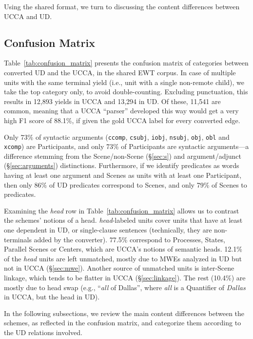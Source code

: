 \documentclass[11pt,a4paper]{article}
\begin{document}
Using the shared format,
we turn to discussing the content differences between UCCA and UD.


\subsection{Confusion Matrix}\label{sec:confusion}

Table~\ref{tab:confusion_matrix} presents the confusion matrix of categories between converted UD
and the UCCA, in the shared EWT corpus.
In case of multiple units with the same terminal yield (i.e., unit with a single non-remote child),
we take the top category only, to avoid double-counting.
Excluding punctuation, this results in 12,893 yields in UCCA and
13,294 in UD.
Of these, 11,541 are common, meaning that a UCCA ``parser'' developed this way
would get a very high F1 score
of 88.1\%, if given the gold UCCA label for every converted edge.

Only 73\% of syntactic arguments
(\texttt{ccomp}, \texttt{csubj}, \texttt{iobj}, \texttt{nsubj}, \texttt{obj}, \texttt{obl} and \texttt{xcomp})
are Participants,
and only 73\% of Participants are syntactic arguments---a difference stemming from
the Scene/non-Scene (\S\ref{sec:s}) and argument/adjunct (\S\ref{sec:arguments}) distinctions.
Furthermore, if we identify predicates as words having at least one argument
and Scenes as units with at least one Participant,
then only 86\% of UD predicates correspond to Scenes,
and only 79\% of Scenes to predicates.

Examining the {\it head} row in Table~\ref{tab:confusion_matrix} allows
us to contrast the schemes' notions of a head. 
{\it head}-labeled units cover units that have at least
one dependent in UD, or single-clause sentences (technically, they are non-terminals added by the converter).
77.5\% correspond to Processes, States, Parallel Scenes or Centers,
which are UCCA's notions of semantic heads.
12.1\% of the {\it head} units are left unmatched, mostly due to MWEs analyzed in
UD but not in UCCA (\S\ref{sec:mwe}).
Another source of unmatched units is inter-Scene linkage, which tends to be flatter in
UCCA (\S\ref{sec:linkage}).
The rest (10.4\%) are mostly due to head swap (e.g., ``\textit{all} of Dallas'', where \textit{all}
is a Quantifier of \textit{Dallas} in UCCA, but the head in UD).

In the following subsections, we review the main content differences between the schemes,
as reflected in the confusion matrix, and categorize them according to the UD relations
involved.
\end{document}
